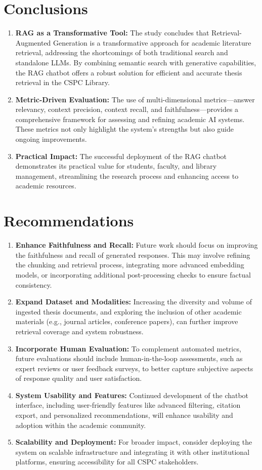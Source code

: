 \section*{Conclusions}
\begin{enumerate}
\item \textbf{RAG as a Transformative Tool:} The study concludes that Retrieval-Augmented Generation is a transformative approach for academic literature retrieval, addressing the shortcomings of both traditional search and standalone LLMs. By combining semantic search with generative capabilities, the RAG chatbot offers a robust solution for efficient and accurate thesis retrieval in the CSPC Library.
\item \textbf{Metric-Driven Evaluation:} The use of multi-dimensional metrics---answer relevancy, context precision, context recall, and faithfulness---provides a comprehensive framework for assessing and refining academic AI systems. These metrics not only highlight the system’s strengths but also guide ongoing improvements.
\item \textbf{Practical Impact:} The successful deployment of the RAG chatbot demonstrates its practical value for students, faculty, and library management, streamlining the research process and enhancing access to academic resources.
\end{enumerate}

\section*{Recommendations}
\begin{enumerate}
\item \textbf{Enhance Faithfulness and Recall:} Future work should focus on improving the faithfulness and recall of generated responses. This may involve refining the chunking and retrieval process, integrating more advanced embedding models, or incorporating additional post-processing checks to ensure factual consistency.
\item \textbf{Expand Dataset and Modalities:} Increasing the diversity and volume of ingested thesis documents, and exploring the inclusion of other academic materials (e.g., journal articles, conference papers), can further improve retrieval coverage and system robustness.
\item \textbf{Incorporate Human Evaluation:} To complement automated metrics, future evaluations should include human-in-the-loop assessments, such as expert reviews or user feedback surveys, to better capture subjective aspects of response quality and user satisfaction.
\item \textbf{System Usability and Features:} Continued development of the chatbot interface, including user-friendly features like advanced filtering, citation export, and personalized recommendations, will enhance usability and adoption within the academic community.
\item \textbf{Scalability and Deployment:} For broader impact, consider deploying the system on scalable infrastructure and integrating it with other institutional platforms, ensuring accessibility for all CSPC stakeholders.
\end{enumerate}